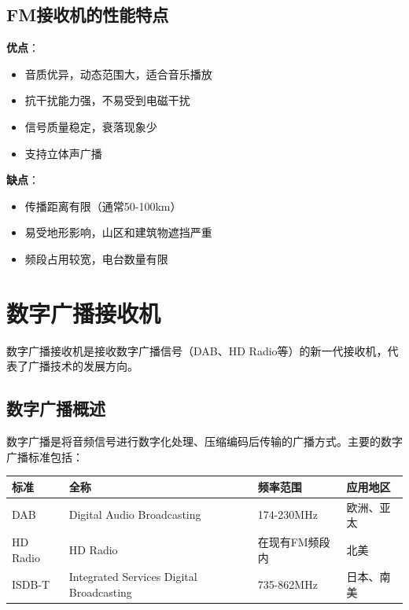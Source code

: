 \subsection{FM接收机的性能特点}
\label{sec:fm_receiver_performance}

\textbf{优点}：
\begin{itemize}
    \item 音质优异，动态范围大，适合音乐播放
    \item 抗干扰能力强，不易受到电磁干扰
    \item 信号质量稳定，衰落现象少
    \item 支持立体声广播
\end{itemize}

\textbf{缺点}：
\begin{itemize}
    \item 传播距离有限（通常50-100km）
    \item 易受地形影响，山区和建筑物遮挡严重
    \item 频段占用较宽，电台数量有限
\end{itemize}

\section{数字广播接收机}
\label{sec:digital_broadcast_receiver}

数字广播接收机是接收数字广播信号（DAB、HD Radio等）的新一代接收机，代表了广播技术的发展方向。

\subsection{数字广播概述}
\label{sec:digital_broadcast_intro}

数字广播是将音频信号进行数字化处理、压缩编码后传输的广播方式。主要的数字广播标准包括：

\begin{center}
\begin{tabular}{|p{3cm}|p{4cm}|p{4cm}|p{3cm}|}
\hline
\textbf{标准} & \textbf{全称} & \textbf{频率范围} & \textbf{应用地区} \\
\hline
DAB & Digital Audio Broadcasting & 174-230MHz & 欧洲、亚太 \\
HD Radio & HD Radio & 在现有FM频段内 & 北美 \\
ISDB-T & Integrated Services Digital Broadcasting & 735-862MHz & 日本、南美 \\
\hline
\end{tabular}
\end{center}

